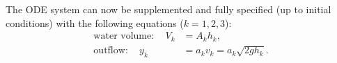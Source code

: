 \documentclass[12pt,a4paper]{article}
\begin{document}
	The ODE system can now be supplemented 
	and
	fully specified
	(up to initial conditions)
	with the following
	equations
	($k = 1, 2, 3$):
	\begin{align}
		\text{water volume}: \quad
		V_k & = A_k h_k,
		\\
		\text{outflow}: \quad
		y_k & = a_k v_k = a_k \sqrt{ 2 g h_k }
		.
	\end{align}

% 	
\end{document}
